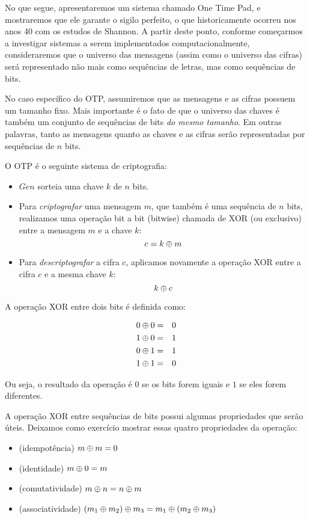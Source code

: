 No que segue, apresentaremos um sistema chamado One Time Pad, e mostraremos que ele garante o sigilo perfeito, o que historicamente ocorreu nos anos 40 com os estudos de Shannon.
A partir deste ponto, conforme começarmos a investigar sistemas a serem implementados computacionalmente, consideraremos que o universo das mensagens (assim como o universo das cifras) será representado não mais como sequências de letras, mas como sequências de bits.

No caso específico do OTP, assumiremos que as mensagens e as cifras possuem um tamanho fixo.
Mais importante é o fato de que o universo das chaves é também um conjunto de sequências de bits {\em do mesmo tamanho}.
Em outras palavras, tanto as mensagens quanto as chaves e as cifras serão representadas por sequências de $n$ bits.

O OTP é o seguinte sistema de criptografia:
\begin{itemize}
\item $Gen$ sorteia uma chave $k$ de $n$ bits.
\item Para {\em criptografar} uma mensagem $m$, que também é uma sequência de $n$ bits, realizamos uma operação bit a bit (bitwise) chamada de XOR (ou exclusivo) entre a mensagem $m$ e a chave $k$:
  \begin{displaymath}
    c = k \oplus m
  \end{displaymath}
\item Para {\em descriptografar} a cifra $c$, aplicamos novamente a operação XOR entre a cifra $c$ e a mesma chave $k$:
  \begin{displaymath}
    k \oplus c
  \end{displaymath}
\end{itemize}

A operação XOR entre dois bits é definida como:

\begin{eqnarray*}
  0 \oplus 0 & = & 0\\
  1 \oplus 0 & = & 1\\
  0 \oplus 1 & = & 1\\
  1 \oplus 1 & = & 0
\end{eqnarray*}

Ou seja, o resultado da operação é $0$ se os bits forem iguais e $1$ se eles forem diferentes.

A operação XOR entre sequências de bits possui algumas propriedades que serão úteis.
Deixamos como exercício mostrar essas quatro propriedades da operação:

\begin{itemize}
\item[] (idempotência) $m \oplus m = 0$
\item[] (identidade) $m \oplus 0 = m$
\item[] (comutatividade) $m \oplus n = n \oplus m$
\item[] (associatividade) $(m_1 \oplus m_2) \oplus m_3 = m_1 \oplus (m_2 \oplus m_3)$
\end{itemize}

